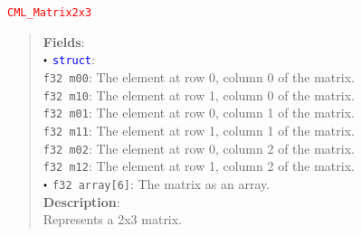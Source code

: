 \documentclass[a4paper,oneside,8pt]{extarticle}
\newcommand{\union}[1]{
  \noindent\textcolor{red}{\texttt{#1}}
  \vspace{-0.3em}
}
\renewcommand{\dot}{\raisebox{0.3ex}{\scalebox{0.6}{$\bullet$}}}
\theoremstyle{definition}
\begin{document}
\union{CML\_Matrix2x3}
\begin{quote}
  \textbf{Fields}: \\
  $\dot$ \textcolor{blue}{\texttt{struct}}: \\
  \indent\hspace{1em} \texttt{f32 m00}: The element at row 0, column 0 of the matrix. \\
  \indent\hspace{1em} \texttt{f32 m10}: The element at row 1, column 0 of the matrix. \\
  \indent\hspace{1em} \texttt{f32 m01}: The element at row 0, column 1 of the matrix. \\
  \indent\hspace{1em} \texttt{f32 m11}: The element at row 1, column 1 of the matrix. \\
  \indent\hspace{1em} \texttt{f32 m02}: The element at row 0, column 2 of the matrix. \\
  \indent\hspace{1em} \texttt{f32 m12}: The element at row 1, column 2 of the matrix. \\
  $\dot$ \texttt{f32 array[6]}: The matrix as an array. \\

  \vspace{-0.75em}
  \textbf{Description}: \\
  Represents a 2x3 matrix. \\
\end{quote}
\end{document}
